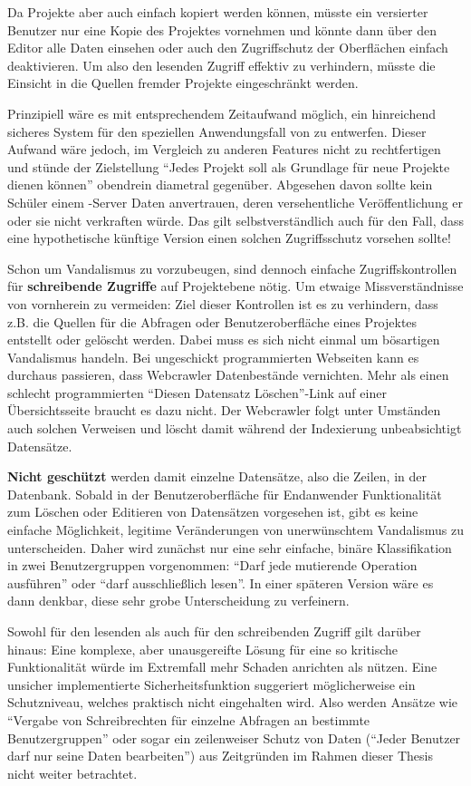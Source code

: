 Da Projekte aber auch einfach kopiert werden können, müsste ein versierter Benutzer nur eine Kopie des Projektes vornehmen und könnte dann über den Editor alle Daten einsehen oder auch den Zugriffschutz der Oberflächen einfach deaktivieren. Um also den lesenden Zugriff effektiv zu verhindern, müsste die Einsicht in die Quellen fremder Projekte eingeschränkt werden.

Prinzipiell wäre es mit entsprechendem Zeitaufwand möglich, ein hinreichend sicheres System für den speziellen Anwendungsfall von \idename{} zu entwerfen. Dieser Aufwand wäre jedoch, im Vergleich zu anderen Features nicht zu rechtfertigen und stünde der Zielstellung "`Jedes Projekt soll als Grundlage für neue Projekte dienen können"' obendrein diametral gegenüber. Abgesehen davon sollte kein Schüler einem \idename{}-Server Daten anvertrauen, deren versehentliche Veröffentlichung er oder sie nicht verkraften würde. Das gilt selbstverständlich auch für den Fall, dass eine hypothetische künftige Version einen solchen Zugriffsschutz vorsehen sollte!

Schon um Vandalismus zu vorzubeugen, sind dennoch einfache Zugriffskontrollen für \textbf{schreibende Zugriffe} auf Projektebene nötig. Um etwaige Missverständnisse von vornherein zu vermeiden: Ziel dieser Kontrollen ist es zu verhindern, dass z.B. die Quellen für die Abfragen oder Benutzeroberfläche eines Projektes entstellt oder gelöscht werden. Dabei muss es sich nicht einmal um bösartigen Vandalismus handeln. Bei ungeschickt programmierten Webseiten kann es durchaus passieren, dass Webcrawler Datenbestände vernichten. Mehr als einen schlecht programmierten "`Diesen Datensatz Löschen"'-Link auf einer Übersichtsseite braucht es dazu nicht. Der Webcrawler folgt unter Umständen auch solchen Verweisen und löscht damit während der Indexierung unbeabsichtigt Datensätze.

\textbf{Nicht geschützt} werden damit einzelne Datensätze, also die Zeilen, in der Datenbank. Sobald in der Benutzeroberfläche für Endanwender Funktionalität zum Löschen oder Editieren von Datensätzen vorgesehen ist, gibt es keine einfache Möglichkeit, legitime Veränderungen von unerwünschtem Vandalismus zu unterscheiden. Daher wird zunächst nur eine sehr einfache, binäre Klassifikation in zwei Benutzergruppen vorgenommen: "`Darf jede mutierende Operation ausführen"' oder "`darf ausschließlich lesen"'. In einer späteren Version wäre es dann denkbar, diese sehr grobe Unterscheidung zu verfeinern.

Sowohl für den lesenden als auch für den schreibenden Zugriff gilt darüber hinaus: Eine komplexe, aber unausgereifte Lösung für eine so kritische Funktionalität würde im Extremfall mehr Schaden anrichten als nützen. Eine unsicher implementierte Sicherheitsfunktion suggeriert möglicherweise ein Schutzniveau, welches praktisch nicht eingehalten wird. Also werden Ansätze wie "`Vergabe von Schreibrechten für einzelne Abfragen an bestimmte Benutzergruppen"' oder sogar ein zeilenweiser Schutz von Daten ("`Jeder Benutzer darf nur seine Daten bearbeiten"') aus Zeitgründen im Rahmen dieser Thesis nicht weiter betrachtet.

